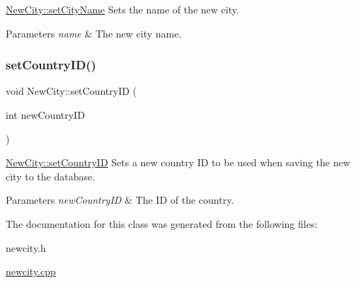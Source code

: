 \mbox{\hyperlink{class_new_city_afe093fcb1aa6623e896c52ea35ff0481}{New\+City\+::set\+City\+Name}} Sets the name of the new city. 


\begin{DoxyParams}{Parameters}
{\em name} & The new city name. \\
\hline
\end{DoxyParams}
\mbox{\label{class_new_city_a8a96f2c58640c96faf74e1f3bb956e4e}} 
\subsubsection{\texorpdfstring{set\+Country\+I\+D()}{setCountryID()}}
{\footnotesize\ttfamily void New\+City\+::set\+Country\+ID (\begin{DoxyParamCaption}\item[{int}]{new\+Country\+ID }\end{DoxyParamCaption})}



\mbox{\hyperlink{class_new_city_a8a96f2c58640c96faf74e1f3bb956e4e}{New\+City\+::set\+Country\+ID}} Sets a new country ID to be used when saving the new city to the database. 


\begin{DoxyParams}{Parameters}
{\em new\+Country\+ID} & The ID of the country. \\
\hline
\end{DoxyParams}


The documentation for this class was generated from the following files\+:\begin{DoxyCompactItemize}
\item 
newcity.\+h\item 
\mbox{\hyperlink{newcity_8cpp}{newcity.\+cpp}}\end{DoxyCompactItemize}
